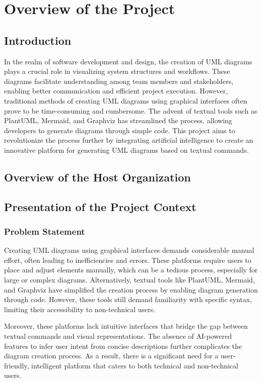 \chapter[Overview]{Overview of the Project}
\minitoc

\section{Introduction}
In the realm of software development and design, the creation of UML diagrams plays a crucial role in visualizing system structures and workflows. These diagrams facilitate understanding among team members and stakeholders, enabling better communication and efficient project execution. However, traditional methods of creating UML diagrams using graphical interfaces often prove to be time-consuming and cumbersome. The advent of textual tools such as PlantUML, Mermaid, and Graphviz has streamlined the process, allowing developers to generate diagrams through simple code. This project aims to revolutionize the process further by integrating artificial intelligence to create an innovative platform for generating UML diagrams based on textual commands.

\section{Overview of the Host Organization}

\section{Presentation of the Project Context}

\subsection{Problem Statement}
Creating UML diagrams using graphical interfaces demands considerable manual effort, often leading to inefficiencies and errors. These platforms require users to place and adjust elements manually, which can be a tedious process, especially for large or complex diagrams. Alternatively, textual tools like PlantUML, Mermaid, and Graphviz have simplified the creation process by enabling diagram generation through code. However, these tools still demand familiarity with specific syntax, limiting their accessibility to non-technical users.

Moreover, these platforms lack intuitive interfaces that bridge the gap between textual commands and visual representations. The absence of AI-powered features to infer user intent from concise descriptions further complicates the diagram creation process. As a result, there is a significant need for a user-friendly, intelligent platform that caters to both technical and non-technical users.

